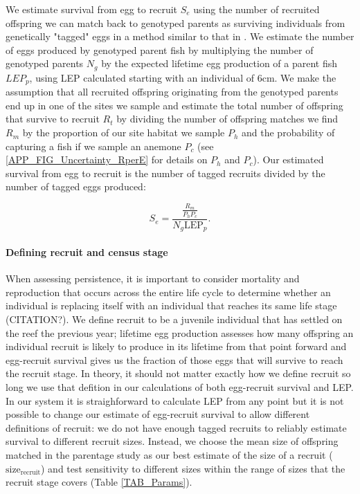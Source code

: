\documentclass[12pt, oneside]{article}   	%
\begin{document}
We estimate survival from egg to recruit $S_e$ using the number of recruited offspring we can match back to genotyped parents as surviving individuals from genetically "tagged" eggs in a method similar to that in \cite{johnson2018integrating}. We estimate the number of eggs produced by genotyped parent fish by multiplying the number of genotyped parents $N_g$ by the expected lifetime egg production of a parent fish $LEP_p$, using LEP calculated starting with an individual of 6cm. We make the assumption that all recruited offspring originating from the genotyped parents end up in one of the sites we sample and estimate the total number of offspring that survive to recruit $R_t$ by dividing the number of offspring matches we find $R_m$ by the proportion of our site habitat we sample $P_h$ and the probability of capturing a fish if we sample an anemone $P_c$ (see \ref{APP_FIG_Uncertainty_RperE} for details on $P_h$ and $P_c$). Our estimated survival from egg to recruit is the number of tagged recruits divided by the number of tagged eggs produced:

\begin{equation}
S_e = \frac{\frac{R_m}{P_h P_c}}{N_g \text{LEP}_p}. \label{EQN_EggRecruitSurv}
\end{equation}

\paragraph*{Defining recruit and census stage} %

When assessing persistence, it is important to consider mortality and reproduction that occurs across the entire life cycle to determine whether an individual is replacing itself with an individual that reaches its same life stage (CITATION?). We define recruit to be a juvenile individual that has settled on the reef the previous year; lifetime egg production assesses how many offspring an individual recruit is likely to produce in its lifetime from that point forward and egg-recruit survival gives us the fraction of those eggs that will survive to reach the recruit stage. In theory, it should not matter exactly how we define recruit so long we use that defition in our calculations of both egg-recruit survival and LEP. In our system it is straighforward to calculate LEP from any point but it is not possible to change our estimate of egg-recruit survival to allow different definitions of recruit: we do not have enough tagged recruits to reliably estimate survival to different recruit sizes. Instead, we choose the mean size of offspring matched in the parentage study as our best estimate of the size of a recruit ($\text{size}_\text{recruit}$) and test sensitivity to different sizes within the range of sizes that the recruit stage covers (Table \ref{TAB_Params}).
\end{document}
